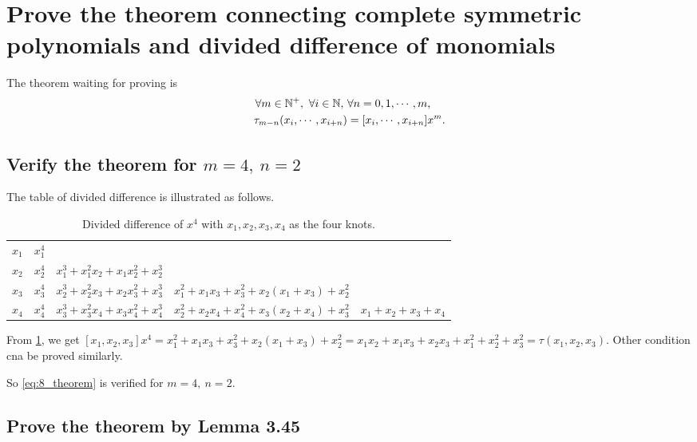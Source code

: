 \documentclass[a4paper]{article}
\begin{document}
\section{Prove the theorem connecting complete symmetric polynomials and divided difference of monomials}

The theorem waiting for proving is
\begin{align}
  \forall m \in \mathbb{N}^+,\ \forall i \in \mathbb{N},\ & \forall n = 0, 1, \cdots, m, \notag \\ 
  \tau_{m - n} (x_i, \cdots, x_{i + n}) &= [x_i, \cdots, x_{i + n}]x^m. \label{eq:8_theorem}
\end{align}

\subsection{Verify the theorem for $m = 4,\ n = 2$}

The table of divided difference is illustrated as follows.
\begin{table}[htbp]
  \centering
  \begin{tabular}{c|cccc}
    $x_1$ & $x_1^4$ &        &        &        \\ 
    $x_2$ & $x_2^4$ & $x_1^3 + x_1^2 x_2 + x_1 x_2^2 + x_2^3$ &        &        \\ 
    $x_3$ & $x_3^4$ & $x_2^3 + x_2^2 x_3 + x_2 x_3^2 + x_3^3$ & $x_1^2 + x_1x_3 + x_3^2 + x_2(x_1 + x_3) + x_2^2$ &        \\ 
    $x_4$ & $x_4^4$ & $x_3^3 + x_3^2 x_4 + x_3 x_4^2 + x_4^3$ & $x_2^2 + x_2x_4 + x_4^2 + x_3(x_2 + x_4) + x_3^2$ & $x_1 + x_2 + x_3 + x_4$ \\ 
  \end{tabular}
  \caption{Divided difference of $x^4$ with $x_1, x_2, x_3, x_4$ as the four knots.}
  \label{tab:8_divided_difference}
\end{table}

From \cref{tab:8_divided_difference}, we get $[x_1, x_2, x_3]x^4 = x_1^2 + x_1x_3 + x_3^2 + x_2(x_1 + x_3) + x_2^2 = x_1x_2 + x_1x_3 + x_2x_3 + x_1^2 + x_2^2 + x_3^2 = \tau(x_1, x_2, x_3)$. 
Other condition cna be proved similarly.

So \cref{eq:8_theorem} is verified for $m = 4,\ n = 2$.

\subsection{Prove the theorem by Lemma 3.45}
\end{document}
